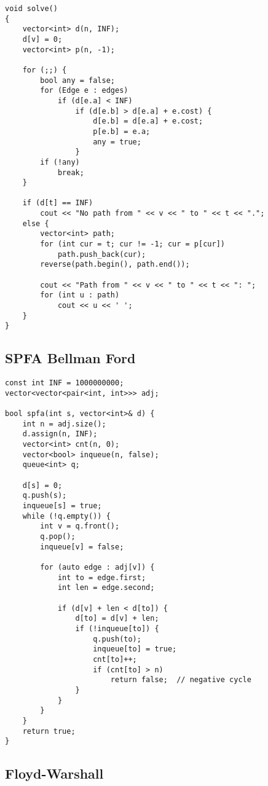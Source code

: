 \documentclass[10pt]{article}
\begin{document}
\begin{multicols*}{2}
\begin{lstlisting}[style=compactcpp]
void solve()
{
    vector<int> d(n, INF);
    d[v] = 0;
    vector<int> p(n, -1);

    for (;;) {
        bool any = false;
        for (Edge e : edges)
            if (d[e.a] < INF)
                if (d[e.b] > d[e.a] + e.cost) {
                    d[e.b] = d[e.a] + e.cost;
                    p[e.b] = e.a;
                    any = true;
                }
        if (!any)
            break;
    }

    if (d[t] == INF)
        cout << "No path from " << v << " to " << t << ".";
    else {
        vector<int> path;
        for (int cur = t; cur != -1; cur = p[cur])
            path.push_back(cur);
        reverse(path.begin(), path.end());

        cout << "Path from " << v << " to " << t << ": ";
        for (int u : path)
            cout << u << ' ';
    }
}
\end{lstlisting}

\subsection{SPFA Bellman Ford}
\begin{lstlisting}[style=compactcpp]
const int INF = 1000000000;
vector<vector<pair<int, int>>> adj;

bool spfa(int s, vector<int>& d) {
    int n = adj.size();
    d.assign(n, INF);
    vector<int> cnt(n, 0);
    vector<bool> inqueue(n, false);
    queue<int> q;

    d[s] = 0;
    q.push(s);
    inqueue[s] = true;
    while (!q.empty()) {
        int v = q.front();
        q.pop();
        inqueue[v] = false;

        for (auto edge : adj[v]) {
            int to = edge.first;
            int len = edge.second;

            if (d[v] + len < d[to]) {
                d[to] = d[v] + len;
                if (!inqueue[to]) {
                    q.push(to);
                    inqueue[to] = true;
                    cnt[to]++;
                    if (cnt[to] > n)
                        return false;  // negative cycle
                }
            }
        }
    }
    return true;
}
\end{lstlisting}


\subsection{Floyd-Warshall}


\end{multicols*}
\end{document}

